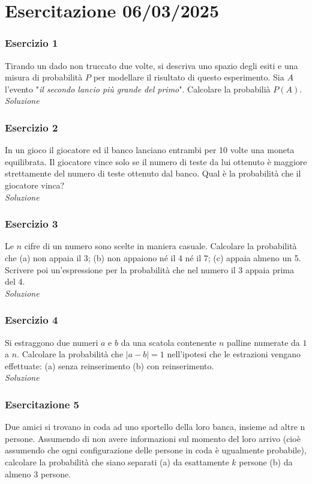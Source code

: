 \section{Esercitazione 06/03/2025}
\subsubsection{Esercizio 1}
Tirando un dado non truccato due volte, si descriva uno spazio degli esiti e una misura di probabilità $P$ per modellare il risultato di questo esperimento. Sia $A$ l’evento "\textit{il secondo lancio più grande del primo}". Calcolare la probabilià $P(A)$.
\\

\textit{Soluzione} \quad 

\subsubsection{Esercizio 2}
In un gioco il giocatore ed il banco lanciano entrambi per 10 volte una moneta equilibrata. Il giocatore vince solo se il numero di teste da lui ottenuto è maggiore strettamente del numero di teste ottenuto dal banco. Qual è la probabilità che il giocatore vinca?
\\

\textit{Soluzione} \quad 

\subsubsection{Esercizio 3}
Le $n$ cifre di un numero sono scelte in maniera casuale. Calcolare la probabilità che
(a) non appaia il 3;
(b) non appaiono né il 4 né il 7; (c) appaia almeno un 5.
Scrivere poi un’espressione per la probabilità che nel numero il 3 appaia prima del 4.
\\

\textit{Soluzione} \quad 

\subsubsection{Esercizio 4} Si estraggono due numeri $a$ e $b$ da una scatola contenente $n$ palline numerate da $1$ a $n$. Calcolare la probabilità che $|a-b| = 1$ nell’ipotesi che le estrazioni vengano effettuate:
(a) senza reinserimento (b) con reinserimento.
\\

\textit{Soluzione} \quad 

\subsubsection{Esercitazione 5} Due amici si trovano in coda ad uno sportello della loro banca, insieme ad altre n persone. Assumendo di non avere informazioni sul momento del loro arrivo (cioè assumendo che ogni configurazione delle persone in coda è ugualmente probabile), calcolare la probabilità che siano separati
(a) da esattamente $k$ persone (b) da almeno 3 persone.
\\

